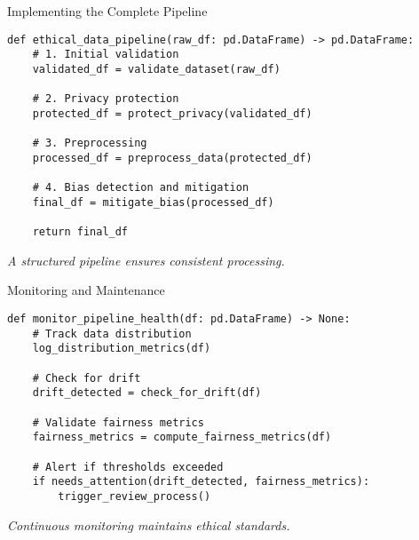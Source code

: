 \documentclass[aspectratio=169]{beamer}
\begin{document}

\begin{frame}[fragile]{Implementing the Complete Pipeline}
\begin{verbatim}
def ethical_data_pipeline(raw_df: pd.DataFrame) -> pd.DataFrame:
    # 1. Initial validation
    validated_df = validate_dataset(raw_df)

    # 2. Privacy protection
    protected_df = protect_privacy(validated_df)

    # 3. Preprocessing
    processed_df = preprocess_data(protected_df)

    # 4. Bias detection and mitigation
    final_df = mitigate_bias(processed_df)

    return final_df
\end{verbatim}

\emph{A structured pipeline ensures consistent processing.}
\end{frame}


\begin{frame}[fragile]{Monitoring and Maintenance}
\begin{verbatim}
def monitor_pipeline_health(df: pd.DataFrame) -> None:
    # Track data distribution
    log_distribution_metrics(df)

    # Check for drift
    drift_detected = check_for_drift(df)

    # Validate fairness metrics
    fairness_metrics = compute_fairness_metrics(df)

    # Alert if thresholds exceeded
    if needs_attention(drift_detected, fairness_metrics):
        trigger_review_process()
\end{verbatim}

\emph{Continuous monitoring maintains ethical standards.}
\end{frame}
\end{document}
